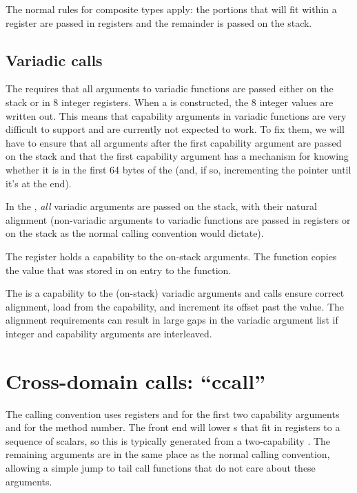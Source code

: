 The normal rules for composite types apply: the portions that will fit within a register are passed in registers and the remainder is passed on the stack.

\subsection{Variadic calls}

The \mipsABI{} requires that all arguments to variadic functions are passed either on the stack or in 8 integer registers.
When a  is constructed, the 8 integer values are written out.
This means that capability arguments in variadic functions are very difficult to support and are currently not expected to work.
To fix them, we will have to ensure that all arguments after the first capability argument are passed on the stack and that the first capability argument has a mechanism for knowing whether it is in the first 64 bytes of the  (and, if so, incrementing the pointer until it's at the end).

In the \sandboxABI{}, \textit{all} variadic arguments are passed on the stack, with their natural alignment (non-variadic arguments to variadic functions are passed in registers or on the stack as the normal calling convention would dictate).

The  register holds a capability to the on-stack arguments.
The  function copies the value that was stored in  on entry to the function.

The  is a capability to the (on-stack) variadic arguments and  calls ensure correct alignment, load from the capability, and increment its offset past the value.
The alignment requirements can result in large gaps in the variadic argument list if integer and capability arguments are interleaved.

\section{Cross-domain calls: ``ccall''}

The  calling convention uses registers  and  for the first two capability arguments and  for the method number.
The front end will lower s that fit in registers to a sequence of scalars, so this is typically generated from a two-capability .
The remaining arguments are in the same place as the normal calling convention, allowing a simple jump to tail call functions that do not care about these arguments.

